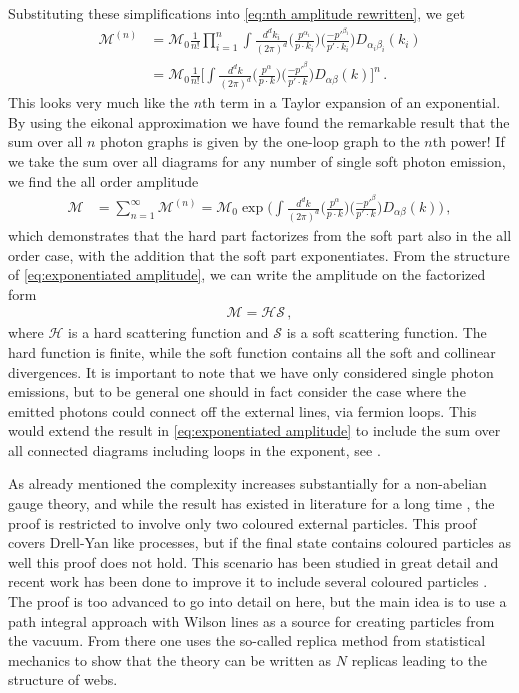 Substituting these simplifications into \cref{eq:nth amplitude rewritten}, we get
\begin{align}
    \mathcal{M}^{(n)}&=\mathcal{M}_{0}\frac{1}{n!}\prod_{i=1}^{n}\int\frac{d^{d}k_i}{(2\pi)^{d}}\big(\frac{p^{\alpha_i}}{p\cdot k_i}\big)\big(\frac{-p'^{\beta_i}}{p'\cdot k_i}\big)D_{\alpha_i\beta_i}(k_i)\nonumber
    \\
    &=\mathcal{M}_{0}\frac{1}{n!}\Big[\int\frac{d^{d}k}{(2\pi)^{d}}\big(\frac{p^{\alpha}}{p\cdot k}\big)\big(\frac{-p'^{\beta}}{p'\cdot k}\big)D_{\alpha\beta}(k)\Big]^{n}\,.
\end{align}
This looks very much like the $n$th term in a Taylor expansion of an exponential. By using the eikonal approximation we have found the remarkable result that the sum over all $n$ photon graphs is given by the one-loop graph to the $n$th power! If we take the sum over all diagrams for any number of single soft photon emission, we find the all order amplitude
\begin{align}\label{eq:exponentiated amplitude}
    \mathcal{M}&=\sum_{n=1}^{\infty}\mathcal{M}^{(n)}=\mathcal{M}_{0}\exp\Big(\int\frac{d^{d}k}{(2\pi)^{d}}\big(\frac{p^{\alpha}}{p\cdot k}\big)\big(\frac{-p'^{\beta}}{p'\cdot k}\big)D_{\alpha\beta}(k)\Big)\,,
\end{align}
which demonstrates that the hard part factorizes from the soft part also in the all order case, with the addition that the soft part exponentiates. From the structure of \cref{eq:exponentiated amplitude}, we can write the amplitude on the factorized form
\begin{align}
    \mathcal{M}=\mathcal{H}\mathcal{S}\,,
\end{align}
where $\mathcal{H}$ is a hard scattering function and $\mathcal{S}$ is a soft scattering function. The hard function is finite, while the soft function contains all the soft and collinear divergences. It is important to note that we have only considered single photon emissions, but to be general one should in fact consider the case where the emitted photons could connect off the external lines, via fermion loops. This would extend the result in \cref{eq:exponentiated amplitude} to include the sum over all connected diagrams including loops in the exponent, see \cite{1961AnPhy..13..379Y}. 

As already mentioned the complexity increases substantially for a non-abelian gauge theory, and while the result has existed in literature for a long time \cite{Gatheral:1983cz,Frenkel:1984pz}, the proof is restricted to involve only two coloured external particles. This proof covers Drell-Yan like processes, but if the final state contains coloured particles as well this proof does not hold. This scenario has been studied in great detail and recent work has been done to improve it to include several coloured particles \cite{White:2015wha,Laenen:2008gt}. The proof is too advanced to go into detail on here, but the main idea is to use a path integral approach with Wilson lines as a source for creating particles from the vacuum. From there one uses the so-called replica method from statistical mechanics to show that the theory can be written as $N$ replicas leading to the structure of webs.


